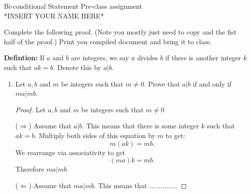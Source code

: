 \documentclass[12pt]{article}
\begin{document}
\begin{center}
    Bi-conditional Statement Pre-class assignment\\
    *INSERT YOUR NAME HERE*
\end{center}

Complete the following proof. (Note you mostly just need to copy and the fist half of the proof.)  Print you compiled document and bring it to class.

\noindent \textbf{Defintion:} If $a$ and $b$ are integers, we say $a$ {\color{blue} divides} $b$ if there is another integer $k$ such that $ak=b$. Denote this by $a|b$.
\begin{enumerate}
    \item Let $a,b$ and $m$ be integers such that $m\neq 0$.
        Prove that $a|b$ if and only if $ma|mb$.
        
        \begin{proof}
        Let $a,b$ and $m$ be integers such that $m\neq0$
        
        ($\Rightarrow$)  Assume that $a|b$.  This means that there is some integer $k$ such that $ak=b$.  Multiply both sides of this equation by $m$ to get:
            $$m(ak)=mb.$$ 
        We rearrange via associativity to get $$(ma)k=mb.$$
            Therefore $ma|mb$
            
        ($\Leftarrow$) Assume that $ma|mb$.  This means that ...............
            
        \end{proof}
\end{enumerate}
\end{document}
